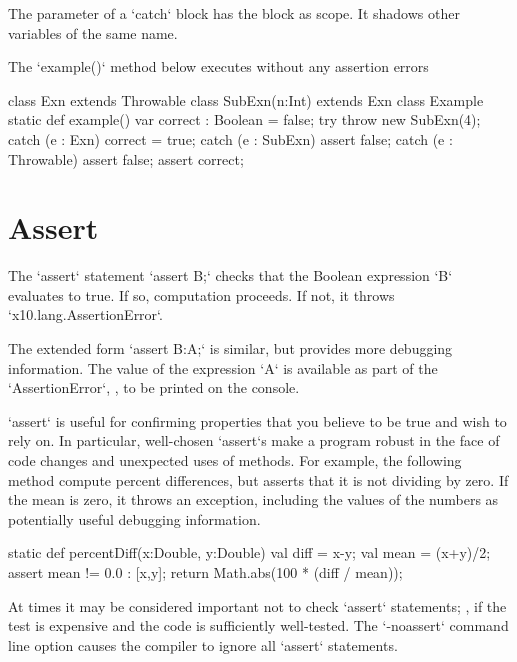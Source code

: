 The parameter of a \xcd`catch` block has the block as scope.  It shadows other
variables of the same name.

\begin{ex}
The \xcd`example()` method below executes without any assertion errors
\begin{xten}
class Exn extends Throwable{}
class SubExn(n:Int) extends Exn{}
class Example {
  static def example() {
    var correct : Boolean = false;
    try {
       throw new SubExn(4);
    }
    catch (e : Exn)          { correct = true; }
    catch (e : SubExn)       { assert false; }
    catch (e : Throwable)    { assert false; }
    assert correct; 
  }
}
\end{xten}

\end{ex}


\section{Assert}

The \xcd`assert` statement 
\xcd`assert B;` 
checks that the Boolean expression \xcd`B` evaluates to true.  If so,
computation proceeds.  If not, it throws \xcd`x10.lang.AssertionError`.

The extended form 
\xcd`assert B:A;`
is similar, but provides more debugging information.  The value of the
expression \xcd`A` is available as part of the \xcd`AssertionError`, \eg, to
be printed on the console.

\begin{ex}
\xcd`assert` is useful for confirming properties that you believe to be true
and wish to rely on.  In particular, well-chosen \xcd`assert`s make a program
robust in the face of code changes and unexpected uses of methods.
For example, the following method compute percent differences, but asserts
that it is not dividing by zero.  If the mean is zero, it throws an exception,
including the values of the numbers as potentially useful debugging
information. 
\begin{xten}
static def percentDiff(x:Double, y:Double) {
  val diff = x-y;
  val mean = (x+y)/2;
  assert mean != 0.0  : [x,y]; 
  return Math.abs(100 * (diff / mean));
}
\end{xten}

\end{ex}


At times it may be considered important not to check \xcd`assert` statements;
\eg, if the test is expensive and the code is sufficiently well-tested.  The
\xcd`-noassert` command line option causes the compiler to ignore all
\xcd`assert` statements. 
